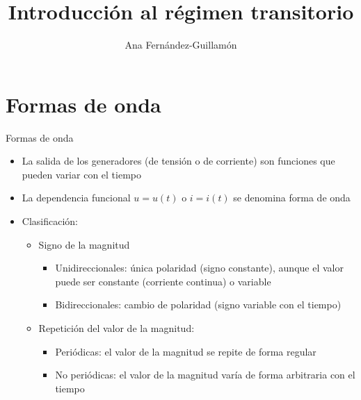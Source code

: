 \documentclass[aspectratio=169, xcolor={usenames,svgnames,dvipsnames}]{beamer}
\author{Ana Fernández-Guillamón}
\date{}
\title{Introducción al régimen transitorio}
\begin{document}
\maketitle

\section{Formas de onda}


\begin{frame}{Formas de onda}
\begin{itemize}
\item La salida de los generadores (de tensión o de corriente) son funciones que pueden variar con el tiempo
\item La dependencia funcional \(u = u(t)\) o \(i = i(t)\) se denomina \alert{forma de onda}
\item Clasificación:
\begin{itemize}
    \item Signo de la magnitud
    \begin{itemize}
\item Unidireccionales: única polaridad (signo constante), aunque el valor puede ser constante (corriente continua) o variable
\item Bidireccionales: cambio de polaridad (signo variable con el tiempo)
\end{itemize}
\item Repetición del valor de la magnitud:
\begin{itemize}
    \item Periódicas: el valor de la magnitud se repite de forma regular
    \item No periódicas: el valor de la magnitud varía de forma arbitraria con el tiempo
\end{itemize}
\end{itemize}
\end{itemize}
\end{frame}

\end{document}
